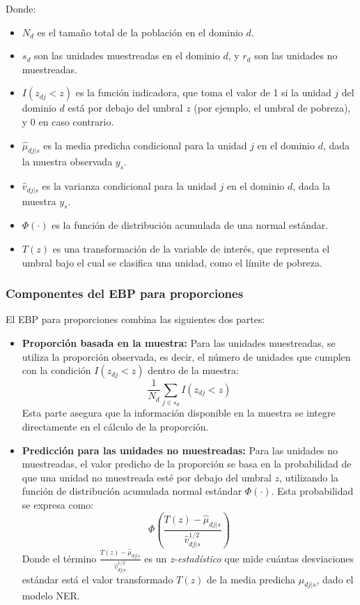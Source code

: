 \documentclass[12pt,spanish]{article}
\begin{document}
Donde:
\begin{itemize}
    \item $N_d$ es el tamaño total de la población en el dominio $d$.
    \item $s_d$ son las unidades muestreadas en el dominio $d$, y $r_d$ son las unidades no muestreadas.
    \item $I(z_{dj} < z)$ es la función indicadora, que toma el valor de 1 si la unidad $j$ del dominio $d$ está por debajo del umbral $z$ (por ejemplo, el umbral de pobreza), y 0 en caso contrario.
    \item $\hat{\mu}_{dj | s}$ es la media predicha condicional para la unidad $j$ en el dominio $d$, dada la muestra observada $y_s$.
    \item $\hat{v}_{dj | s}$ es la varianza condicional para la unidad $j$ en el dominio $d$, dada la muestra $y_s$.
    \item $\Phi(\cdot)$ es la función de distribución acumulada de una normal estándar.
    \item $T(z)$ es una transformación de la variable de interés, que representa el umbral bajo el cual se clasifica una unidad, como el límite de pobreza.
\end{itemize}

\subsubsection*{Componentes del EBP para proporciones}

El EBP para proporciones combina las siguientes dos partes:

\begin{itemize}
    \item \textbf{Proporción basada en la muestra:} Para las unidades muestreadas, se utiliza la proporción observada, es decir, el número de unidades que cumplen con la condición $I(z_{dj} < z)$ dentro de la muestra:
    \[
    \frac{1}{N_d} \sum_{j \in s_d} I(z_{dj} < z)
    \]
    Esta parte asegura que la información disponible en la muestra se integre directamente en el cálculo de la proporción.

    \item \textbf{Predicción para las unidades no muestreadas:} Para las unidades no muestreadas, el valor predicho de la proporción se basa en la probabilidad de que una unidad no muestreada esté por debajo del umbral $z$, utilizando la función de distribución acumulada normal estándar $\Phi(\cdot)$. Esta probabilidad se expresa como:
    \[
    \Phi \left( \frac{T(z) - \hat{\mu}_{dj | s}}{\hat{v}_{dj | s}^{1/2}} \right)
    \]
    Donde el término $\frac{T(z) - \hat{\mu}_{dj | s}}{\hat{v}_{dj | s}^{1/2}}$ es un \textit{z-estadístico} que mide cuántas desviaciones estándar está el valor transformado $T(z)$ de la media predicha $\hat{\mu}_{dj | s}$, dado el modelo NER.
\end{itemize}
\end{document}
